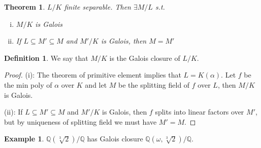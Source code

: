 \documentclass{article}
\theoremstyle{definition}
\newtheorem*{defn*}{Definition}
\newtheorem{example}[defn]{Example}
\theoremstyle{remark}
\theoremstyle{plain}
\newtheorem{thm}[defn]{Theorem}
\newcommand{\QQ}{\mathbb{Q}}
\begin{document}
\begin{thm}
    $L/K$ finite separable. Then $\exists M/L$ s.t. \begin{enumerate}[(i)]
        \item $M/K$ is Galois
        \item If $L\subseteq M'\subseteq M$ and $M'/K$ is Galois, then $M=M'$
    \end{enumerate}
\end{thm}
\begin{defn*}
    We say that $M/K$ is the Galois closure of $L/K$.
\end{defn*}
\begin{proof}
    (i): The theorem of primitive element implies that $L=K(\alpha)$. Let $f$ be the min poly of $\alpha$ over $K$ and let $M$ be the splitting field of $f$ over $L$, then $M/K$ is Galois.
    
    (ii): If $L\subseteq M'\subseteq M$ and $M'/K$ is Galois, then $f$ splits into linear factors over $M'$, but by uniqueness of splitting field we must have $M'=M$.
\end{proof}
\begin{example}
    $\QQ(\sqrt[3]{2})/\QQ$ has Galois closure $\QQ(\omega,\sqrt[3]{2})/\QQ$.
\end{example}
\end{document}
